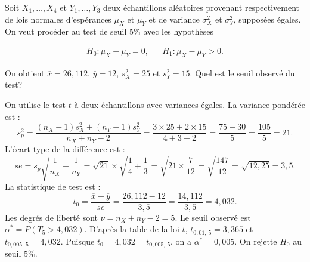 \begin{questions}

\pageblanche

\question[9] Soit $X_1,\hdots,X_{4}$ et $Y_1,\hdots,Y_{3}$ deux échantillons aléatoires provenant respectivement de lois normales d'espérances $\mu_X$ et $\mu_Y$ et de variance $\sigma^2_X$ et $\sigma^2_Y$, supposées égales.
On veut procéder au test de seuil $5\%$ avec les hypothèses

\begin{align*}
    H_0:\mu_X-\mu_Y=0, & & H_1:\mu_X-\mu_Y>0.
\end{align*}

On obtient $\overline{x}=26,112$, $\overline{y}=12$, $s_X^2=25$ et $s_Y^2=15$. Quel est le seuil observé du test?

\begin{solution}
On utilise le test $t$ à deux échantillons avec variances égales. La variance pondérée est :
$$s_p^2=\frac{(n_X-1)s_X^2+(n_Y-1)s_Y^2}{n_X+n_Y-2}=\frac{3\times 25+2\times 15}{4+3-2}=\frac{75+30}{5}=\frac{105}{5}=21.$$
L'écart-type de la différence est :
$$se=s_p\sqrt{\frac{1}{n_X}+\frac{1}{n_Y}}=\sqrt{21}\times\sqrt{\frac{1}{4}+\frac{1}{3}}=\sqrt{21\times\frac{7}{12}}=\sqrt{\frac{147}{12}}=\sqrt{12{,}25}=3{,}5.$$
La statistique de test est :
$$t_0=\frac{\overline{x}-\overline{y}}{se}=\frac{26{,}112-12}{3{,}5}=\frac{14{,}112}{3{,}5}=4{,}032.$$
Les degrés de liberté sont $\nu=n_X+n_Y-2=5$. Le seuil observé est $\alpha^*=P(T_5>4{,}032)$. D'après la table de la loi $t$, $t_{0{,}01,\,5}=3{,}365$ et $t_{0{,}005,\,5}=4{,}032$. Puisque $t_0=4{,}032=t_{0{,}005,\,5}$, on a $\alpha^*=0{,}005$. On rejette $H_0$ au seuil $5\%$.
\end{solution}



\end{questions}
